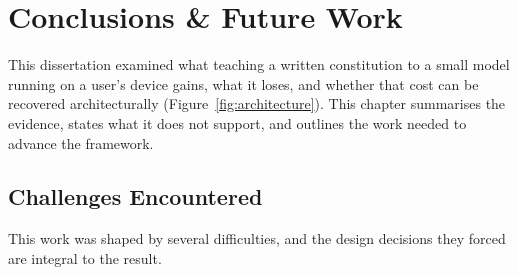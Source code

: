 \chapter{Conclusions \& Future Work}
\label{chap:Conclusions}
\label{chap:conclusion}

This dissertation examined what teaching a written constitution to a small model running on a user's device gains, what it loses, and whether that cost can be recovered architecturally (Figure~\ref{fig:architecture}). This chapter summarises the evidence, states what it does not support, and outlines the work needed to advance the framework.

\section{Challenges Encountered}
\label{sec:conclusion-challenges}

This work was shaped by several difficulties, and the design decisions they forced are integral to the result.

